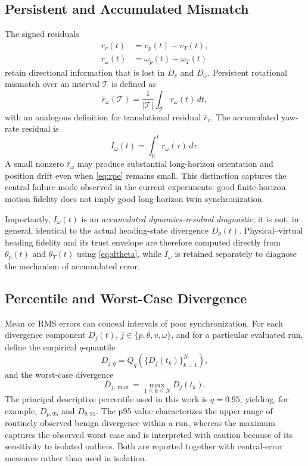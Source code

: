 \documentclass[conference]{IEEEtran}
\newcommand{\Dtheta}{D_{\theta}}
\newcommand{\Dv}{D_{v}}
\newcommand{\Domega}{D_{\omega}}
\newcommand{\Iomega}{I_{\omega}}
\begin{document}
\subsection{Persistent and Accumulated Mismatch}
The signed residuals
\begin{align}
r_v(t)&=v_p(t)-v_T(t),\\
r_{\omega}(t)&=\omega_p(t)-\omega_T(t)
\end{align}
retain directional information that is lost in $\Dv$ and $\Domega$. Persistent rotational mismatch over an interval $\mathcal{T}$ is defined as
\begin{equation}
\bar{r}_{\omega}(\mathcal{T}) = 
\frac{1}{|\mathcal{T}|}\int_{\mathcal{T}} r_{\omega}(t)\,dt,
\label{eq:persistent_yaw}
\end{equation}
with an analogous definition for translational residual $\bar r_v$. The accumulated yaw-rate residual is
\begin{equation}
\Iomega(t) = \int_{0}^{t} r_{\omega}(\tau)\,d\tau.
\label{eq:iomega}
\end{equation}
A small nonzero $\bar r_{\omega}$ may produce substantial long-horizon orientation and position drift even when \eqref{eq:rpe} remains small. This distinction captures the central failure mode observed in the current experiments: good finite-horizon motion fidelity does not imply good long-horizon twin synchronization.

Importantly, $\Iomega(t)$ is an \emph{accumulated dynamics-residual diagnostic}; it is not, in general, identical to the actual heading-state divergence $\Dtheta(t)$. Physical--virtual heading fidelity and its trust envelope are therefore computed directly from $\theta_p(t)$ and $\theta_T(t)$ using \eqref{eq:dtheta}, while $\Iomega$ is retained separately to diagnose the mechanism of accumulated error.

\subsection{Percentile and Worst-Case Divergence}
Mean or RMS errors can conceal intervals of poor synchronization. For each divergence component $D_j(t)$, $j\in\{p,\theta,v,\omega\}$, and for a particular evaluated run, define the empirical $q$-quantile
\begin{equation}
D_{j,q}=Q_q\!\left(\{D_j(t_k)\}_{k=1}^{N}\right),
\end{equation}
and the worst-case divergence
\begin{equation}
D_{j,\max}=\max_{1\le k\le N}D_j(t_k).
\end{equation}
The principal descriptive percentile used in this work is $q=0.95$, yielding, for example, $D_{p,95}$ and $D_{\theta,95}$. The p95 value characterizes the upper range of routinely observed benign divergence within a run, whereas the maximum captures the observed worst case and is interpreted with caution because of its sensitivity to isolated outliers. Both are reported together with central-error measures rather than used in isolation.
\end{document}

